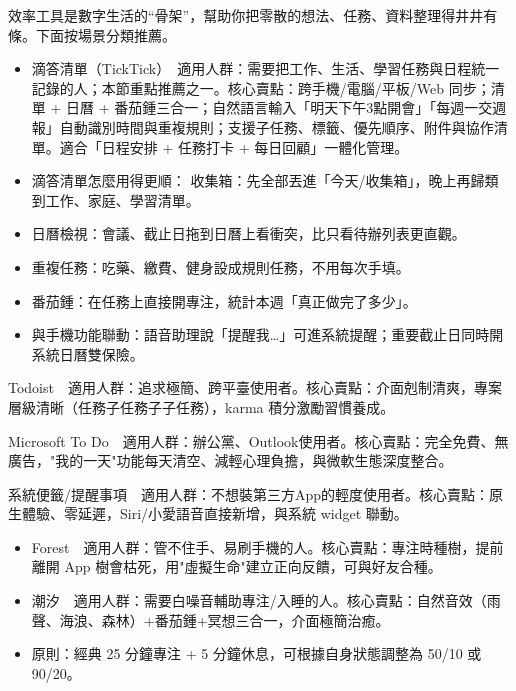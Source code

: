 


效率工具是數字生活的“骨架”，幫助你把零散的想法、任務、資料整理得井井有條。下面按場景分類推薦。


\begin{itemize}
  \item 滴答清單（TickTick）　適用人群：需要把工作、生活、學習任務與日程統一記錄的人；本節重點推薦之一。核心賣點：跨手機/電腦/平板/Web 同步；清單 + 日曆 + 番茄鍾三合一；自然語言輸入「明天下午3點開會」「每週一交週報」自動識別時間與重複規則；支援子任務、標籤、優先順序、附件與協作清單。適合「日程安排 + 任務打卡 + 每日回顧」一體化管理。
  \item 滴答清單怎麼用得更順： 收集箱：先全部丟進「今天/收集箱」，晚上再歸類到工作、家庭、學習清單。
  \item 日曆檢視：會議、截止日拖到日曆上看衝突，比只看待辦列表更直觀。
  \item 重複任務：吃藥、繳費、健身設成規則任務，不用每次手填。
  \item 番茄鍾：在任務上直接開專注，統計本週「真正做完了多少」。
  \item 與手機功能聯動：語音助理說「提醒我…」可進系統提醒；重要截止日同時開系統日曆雙保險。
\end{itemize}

Todoist　適用人群：追求極簡、跨平臺使用者。核心賣點：介面剋制清爽，專案層級清晰（任務子任務子子任務），karma 積分激勵習慣養成。

Microsoft To Do　適用人群：辦公黨、Outlook使用者。核心賣點：完全免費、無廣告，"我的一天"功能每天清空、減輕心理負擔，與微軟生態深度整合。

系統便籤/提醒事項　適用人群：不想裝第三方App的輕度使用者。核心賣點：原生體驗、零延遲，Siri/小愛語音直接新增，與系統 widget 聯動。


\begin{itemize}
  \item Forest　適用人群：管不住手、易刷手機的人。核心賣點：專注時種樹，提前離開 App 樹會枯死，用"虛擬生命"建立正向反饋，可與好友合種。
  \item 潮汐　適用人群：需要白噪音輔助專注/入睡的人。核心賣點：自然音效（雨聲、海浪、森林）+番茄鍾+冥想三合一，介面極簡治癒。
  \item 原則：經典 25 分鐘專注 + 5 分鐘休息，可根據自身狀態調整為 50/10 或 90/20。
\end{itemize}

